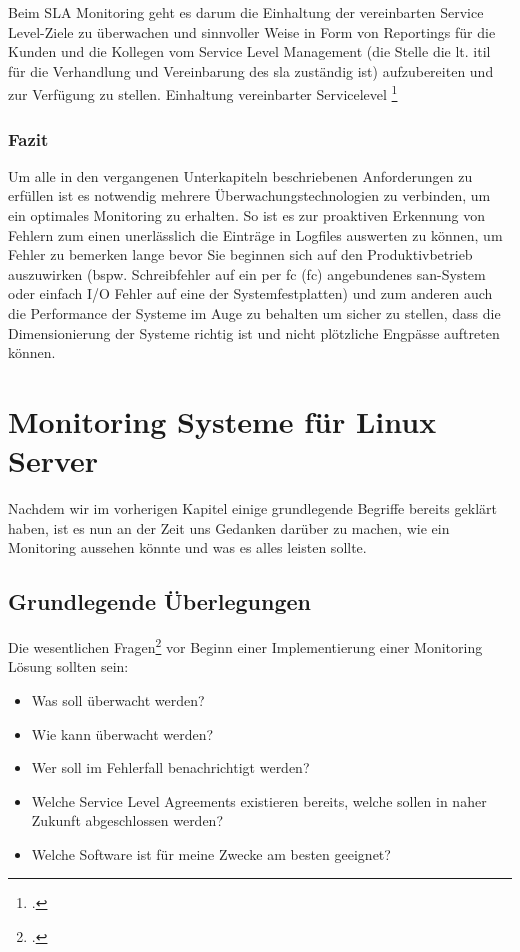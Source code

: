 \documentclass[12pt,a4paper,parskip]{scrreprt}
\begin{document}
	Beim SLA Monitoring geht es darum die Einhaltung der vereinbarten Service Level-Ziele zu überwachen und sinnvoller Weise in Form von Reportings für die Kunden und die Kollegen vom Service Level Management (die Stelle die lt. \acrshort{itil} für die Verhandlung und Vereinbarung des \acrshort{sla} zuständig ist) aufzubereiten und zur Verfügung zu stellen.
	Einhaltung vereinbarter Servicelevel \footcite[40]{iso20000sla}
	\subsection{Fazit}
	Um alle in den vergangenen Unterkapiteln beschriebenen Anforderungen zu erfüllen ist es notwendig mehrere Überwachungstechnologien zu verbinden, um ein optimales Monitoring zu erhalten. So ist es zur proaktiven Erkennung von Fehlern zum einen unerlässlich die Einträge in Logfiles auswerten zu können, um Fehler zu bemerken lange bevor Sie beginnen sich auf den Produktivbetrieb auszuwirken (bspw. Schreibfehler auf ein per \acrlong{fc} (\acrshort{fc}) angebundenes \acrshort{san}-System oder einfach I/O Fehler auf eine der Systemfestplatten) und zum anderen auch die Performance der Systeme im Auge zu behalten um sicher zu stellen, dass die Dimensionierung der Systeme richtig ist und nicht plötzliche Engpässe auftreten können.
	\chapter{Monitoring Systeme für Linux Server}

	Nachdem wir im vorherigen Kapitel einige grundlegende Begriffe bereits geklärt haben, ist es nun an der Zeit uns Gedanken darüber zu machen, wie ein Monitoring aussehen könnte und was es alles leisten sollte. 
	\section{Grundlegende Überlegungen}
	Die wesentlichen Fragen\footcite[nach][]{veltnagios1} vor Beginn einer Implementierung einer Monitoring Lösung sollten sein:
	\begin{itemize}
		\item Was soll überwacht werden?
		\item Wie kann überwacht werden?
		\item Wer soll im Fehlerfall benachrichtigt werden?
		\item Welche Service Level Agreements existieren bereits, welche sollen in naher Zukunft abgeschlossen werden?
		\item Welche Software ist für meine Zwecke am besten geeignet?
	\end{itemize}
\end{document}
